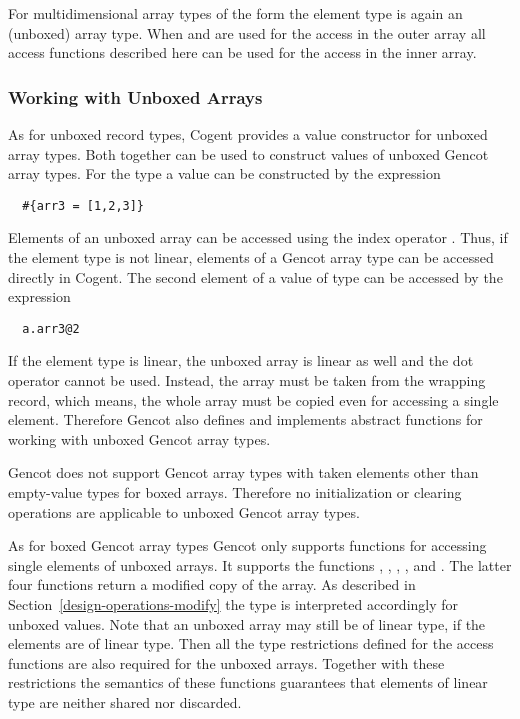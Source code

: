 For multidimensional array types of the form  the element type is again an (unboxed) array type.
When  and  are used for the access in the outer array all access functions described here
can be used for the access in the inner array.

\subsubsection{Working with Unboxed Arrays}

As for unboxed record types, Cogent provides a value constructor for unboxed array types. Both together can be used to 
construct values of unboxed Gencot array types. For the type  a value can be constructed by the expression
\begin{verbatim}
  #{arr3 = [1,2,3]}
\end{verbatim}

Elements of an unboxed array can be accessed using the index operator . Thus, if the element type is not linear,
elements of a Gencot array type can be accessed directly in Cogent. The second element of a value  of type 
can be accessed by the expression
\begin{verbatim}
  a.arr3@2
\end{verbatim}

If the element type is linear, the unboxed array is linear as well and the dot operator cannot be used. Instead, the array must be
taken from the wrapping record, which means, the whole array must be copied even for accessing a single element.
Therefore Gencot also defines and implements abstract functions for working with unboxed Gencot array types.

Gencot does not support Gencot array types with taken elements other than empty-value types for boxed arrays. Therefore no
initialization or clearing operations are applicable to unboxed Gencot array types.

As for boxed Gencot array types Gencot only supports functions for accessing single elements of unboxed arrays. It supports the 
functions , , , , and .
The latter four functions return a modified copy of the array. As described in Section~\ref{design-operations-modify} 
the  type is interpreted accordingly for unboxed values. Note that
an unboxed array may still be of linear type, if the elements are of linear type. Then all the type restrictions
defined for the access functions are also required for the unboxed arrays. Together with these restrictions the semantics
of these functions guarantees that elements of linear type are neither shared nor discarded.


